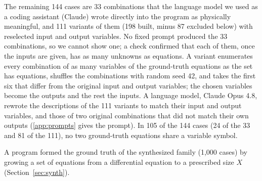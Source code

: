 The remaining 144 cases are 33 combinations that the language
model we used as a coding assistant (Claude) wrote directly into the program as physically
meaningful, and 111 variants of them (198 built, minus 87 excluded below) with reselected input and
output variables. No fixed prompt produced the 33 combinations, so we cannot show one; a check
confirmed that each of them, once the inputs are given, has as many unknowns as equations. A
variant enumerates every combination of as many variables of the ground-truth equations as the set
has equations, shuffles the combinations with random seed 42, and takes the first six that differ
from the original input and output variables; the chosen variables become the outputs and the rest
the inputs. A language model, Claude Opus 4.8\cite{ClaudeOpus48}, rewrote the descriptions of the
111 variants to match their input and output variables, and those of two original combinations
that did not match their own outputs (\ref{app:prompts} gives the prompt). In 105 of the 144 cases
(24 of the 33 and 81 of the 111), no two ground-truth equations share a variable symbol.

A program formed the ground truth of the synthesized family (1,000 cases) by growing a set of
equations from a differential equation to a prescribed size $X$ (Section~\ref{sec:synth}).

